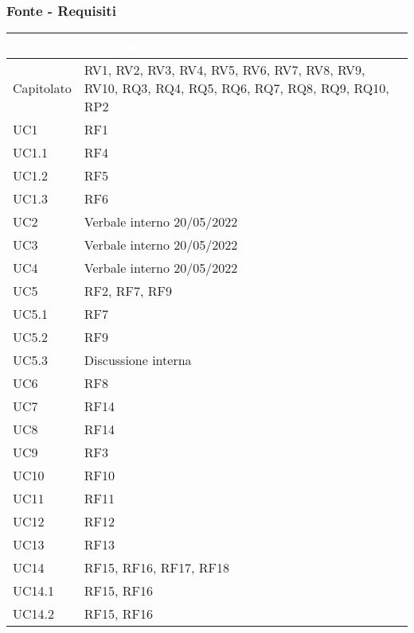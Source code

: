 \subsubsection{Fonte - Requisiti}
{
      \setlength{\freewidth}{\dimexpr\textwidth-0\tabcolsep}
      \renewcommand{\arraystretch}{1.5}
      \centering
      \setlength{\aboverulesep}{0pt}
      \setlength{\belowrulesep}{0pt}
      \begin{longtable}{C{.47\freewidth} C{.47\freewidth}}
         \toprule
      \textcolor{white}{\textbf{Fonte}}&
      \textcolor{white}{\textbf{Requisiti}}\\
      \toprule
      \endhead
      
      Capitolato & RV1, RV2, RV3, RV4, RV5, RV6, RV7, RV8, RV9, RV10,
                   RQ3, RQ4, RQ5, RQ6, RQ7, RQ8, RQ9, RQ10,
                   RP2\\
      UC1 & RF1\\
      UC1.1 & RF4\\
      UC1.2 & RF5\\
      UC1.3 & RF6\\
      UC2 & Verbale interno 20/05/2022\\
      UC3 & Verbale interno 20/05/2022\\
      UC4 & Verbale interno 20/05/2022\\
      UC5 & RF2, RF7, RF9\\
      UC5.1 & RF7\\
      UC5.2 & RF9\\
      UC5.3 & Discussione interna\\
      UC6 & RF8\\
      UC7 & RF14\\
      UC8 & RF14\\
      UC9 & RF3\\
      UC10 & RF10\\
      UC11 & RF11\\
      UC12 & RF12\\
      UC13 & RF13\\
      UC14 & RF15, RF16, RF17, RF18\\
      UC14.1 & RF15, RF16\\
      UC14.2 & RF15, RF16\\

\end{longtable}}
